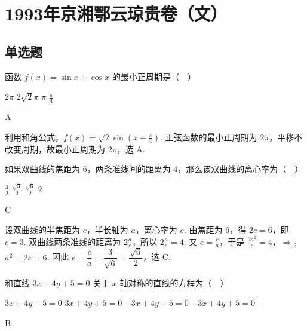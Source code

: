 \chapter{1993年京湘鄂云琼贵卷（文）}
\section{单选题}

\begin{problem}
函数 \(f(x)=\sin x+\cos x\) 的最小正周期是（\(\quad\)）

\choices
    {\(2\pi\)}
    {\(2\sqrt{2}\pi\)}
    {\(\pi\)}
    {\(\frac{\pi}{4}\)}
\end{problem}

\begin{answer}
A
\end{answer}

\begin{solution}
利用和角公式，\(f(x)=\sqrt{2}\sin\left(x+\frac{\pi}{4}\right)\). 正弦函数的最小正周期为 \(2\pi\)，平移不改变周期，故最小正周期为 \(2\pi\)，选 A.
\end{solution}

\begin{problem}
如果双曲线的焦距为 \(6\)，两条准线间的距离为 \(4\)，那么该双曲线的离心率为（\(\quad\)）

\choices
    {\(\frac{3}{2}\)}
    {\(\frac{\sqrt{3}}{2}\)}
    {\(\frac{\sqrt{6}}{2}\)}
    {\(2\)}
\end{problem}

\begin{answer}
C
\end{answer}

\begin{solution}
设双曲线的半焦距为 \(c\)，半长轴为 \(a\)，离心率为 \(e\). 由焦距为 \(6\)，得 \(2c=6\)，即 \(c=3\). 双曲线两条准线的距离为 \(2\frac{a}{e}\)，所以 \(2\frac{a}{e}=4\). 又 \(e=\frac{c}{a}\)，于是
\(\frac{2a^2}{c}=4\)，\(\Longrightarrow\)，\(a^2=2c=6\).
因此 \(e=\dfrac{c}{a}=\dfrac{3}{\sqrt{6}}=\dfrac{\sqrt{6}}{2}\)，选 C.
\end{solution}

\begin{problem}
和直线 \(3x-4y+5=0\) 关于 \(x\) 轴对称的直线的方程为（\(\quad\)）

\choices
    {\(3x+4y-5=0\)}
    {\(3x+4y+5=0\)}
    {\(-3x+4y-5=0\)}
    {\(-3x+4y+5=0\)}
\end{problem}

\begin{answer}
B
\end{answer}

